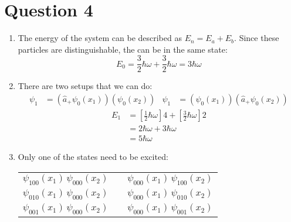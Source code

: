 \documentclass[11pt]{article}
\begin{document}
\newpage

\section*{Question 4}
\begin{enumerate}[label=\alph*)]
\item
The energy of the system can be described as $E_n = E_a + E_b$. Since these particles are distinguishable, the can be in the same state:
\[E_0 = \frac{3}{2}\hbar \omega + \frac{3}{2}\hbar \omega \boxed{= 3 \hbar \omega}\]
\item 
There are two setups that we can do:
\begin{align*}
\psi_1 & = (\hat{a}_+ \psi_0(x_1))(\psi_0(x_2)) & \psi_1 & = (\psi_0(x_1))(\hat{a}_+ \psi_0(x_2))
\end{align*}
\begin{align*}
E_1 & = \left[\frac{1}{2}\hbar \omega\right]4 + \left[\frac{3}{2}\hbar \omega\right]2\\
& = 2\hbar \omega + 3\hbar \omega\\
& \boxed{= 5 \hbar \omega}
\end{align*}

\item Only one of the states need to be excited:

\begin{table}[!hb]
\centering
\begin{tabular}{c c c}
$\psi_{100}(x_1)\,\psi_{000}(x_2)$ & \quad & $\psi_{000}(x_1)\,\psi_{100}(x_2)$\\
$\psi_{010}(x_1)\,\psi_{000}(x_2)$ && $\psi_{000}(x_1)\,\psi_{010}(x_2)$\\
$\psi_{001}(x_1)\,\psi_{000}(x_2)$ && $\psi_{000}(x_1)\,\psi_{001}(x_2)$\\
\end{tabular}
\end{table}
\end{enumerate}

\newpage
\end{document}
